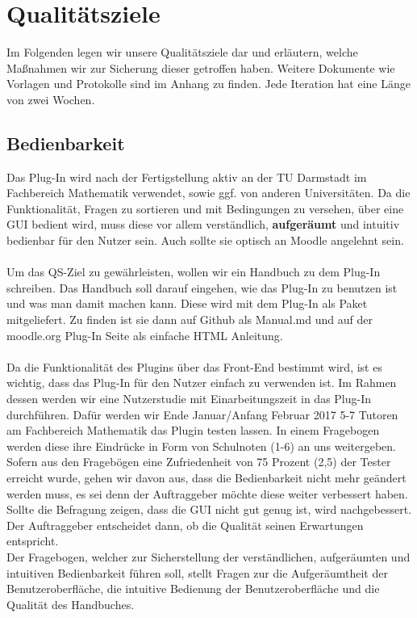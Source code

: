 \documentclass[accentcolor=tud0b,12pt,paper=a4]{tudreport}
\begin{document}
 	
	\chapter{Qualitätsziele}
	
Im Folgenden legen wir unsere Qualitätsziele dar und erläutern, welche Maßnahmen wir zur Sicherung dieser getroffen haben. Weitere Dokumente wie Vorlagen und Protokolle sind im Anhang zu finden.
Jede Iteration hat eine Länge von zwei Wochen.

        \section{Bedienbarkeit}
Das Plug-In wird nach der Fertigstellung aktiv an der TU Darmstadt im Fachbereich Mathematik verwendet, sowie ggf. von anderen Universitäten. Da die Funktionalität, Fragen zu sortieren und mit Bedingungen zu versehen, über eine GUI bedient wird, muss diese vor allem verständlich, \textbf{aufgeräumt} und intuitiv bedienbar für den Nutzer sein. Auch sollte sie optisch an Moodle angelehnt sein. 
\\
\\
Um das QS-Ziel zu gewährleisten, wollen wir ein Handbuch zu dem Plug-In schreiben. Das Handbuch soll darauf eingehen, wie  das Plug-In zu benutzen ist und was man damit machen kann. Diese wird mit dem Plug-In als Paket mitgeliefert. Zu finden ist sie dann auf Github als Manual.md und auf der moodle.org Plug-In Seite als einfache HTML Anleitung.
\\
\\
Da die Funktionalität des Plugins über das Front-End bestimmt wird, ist es wichtig, dass das Plug-In für den Nutzer einfach zu verwenden ist. Im Rahmen dessen werden wir eine Nutzerstudie mit Einarbeitungszeit in das Plug-In durchführen. Dafür werden wir Ende Januar/Anfang Februar 2017 5-7 Tutoren am Fachbereich Mathematik das Plugin testen lassen. In einem Fragebogen werden diese ihre Eindrücke in Form von Schulnoten (1-6) an uns weitergeben. Sofern aus den Fragebögen eine Zufriedenheit von 75 Prozent (2,5) der Tester erreicht wurde, gehen wir davon aus, dass die Bedienbarkeit nicht mehr geändert werden muss, es sei denn der Auftraggeber möchte diese weiter verbessert haben. Sollte die Befragung zeigen, dass die GUI nicht gut genug ist, wird nachgebessert. Der Auftraggeber entscheidet dann, ob die Qualität seinen Erwartungen entspricht.
\\
Der Fragebogen, welcher zur Sicherstellung der verständlichen, aufgeräumten und intuitiven Bedienbarkeit führen soll, stellt Fragen zur die Aufgeräumtheit der Benutzeroberfläche, die intuitive Bedienung der Benutzeroberfläche und die Qualität des Handbuches.
\\
\\
\\
\\
\\ \\ \\ \\
\end{document}
